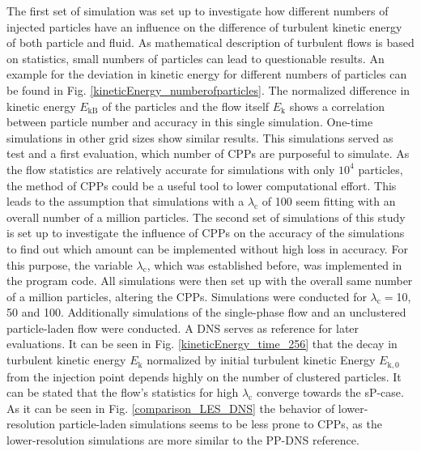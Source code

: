 \documentclass[11pt,a4paper,openany,oneside,parskip=half*]{article}
\begin{document}
The first set of simulation was set up to investigate how different numbers of injected particles have an influence on the difference of turbulent kinetic energy of both particle and fluid. As mathematical description of turbulent flows is based on statistics, small numbers of particles can lead to questionable results. 
\newline
An example for the deviation in kinetic energy for different numbers of particles can be found in Fig. \ref{kineticEnergy_numberofparticles}. The normalized difference in kinetic energy $E_\mathrm{kB}$ of the particles and the flow itself $E_\mathrm{k}$ shows a correlation between particle number and accuracy in this single simulation. One-time simulations in other grid sizes show similar results. 
\newline
This simulations served as test and a first evaluation, which number of CPPs are purposeful to simulate. As the flow statistics are relatively accurate for simulations with only $10^4$ particles, the method of CPPs could be a useful tool to lower computational effort. This leads to the assumption that simulations with a $\lambda_\mathrm{c}$ of 100 seem fitting with an overall number of a million particles. 
\newline
The second set of simulations of this study is set up to investigate the influence of CPPs on the accuracy of the simulations to find out which amount can be implemented without high loss in accuracy. For this purpose, the variable $\lambda_\mathrm{c}$, which was established before, was implemented in the program code. All simulations were then set up with the overall same number of a million particles, altering the CPPs. Simulations were conducted for $\lambda_\mathrm{c}=$10, 50 and 100. Additionally simulations of the single-phase flow and an unclustered particle-laden flow were conducted. A DNS serves as reference for later evaluations. 
\newline
It can be seen in Fig. \ref{kineticEnergy_time_256} that the decay in turbulent kinetic energy $E_\mathrm{k}$ normalized by initial turbulent kinetic Energy $E_\mathrm{k,0}$ from the injection point depends highly on the number of clustered particles. It can be stated that the flow's statistics for high $\lambda_\mathrm{c}$ converge towards the sP-case. 
\newline
As it can be seen in Fig. \ref{comparison_LES_DNS} the behavior of lower-resolution particle-laden simulations seems to be less prone to CPPs, as the lower-resolution simulations are more similar to the PP-DNS reference.
\end{document}
